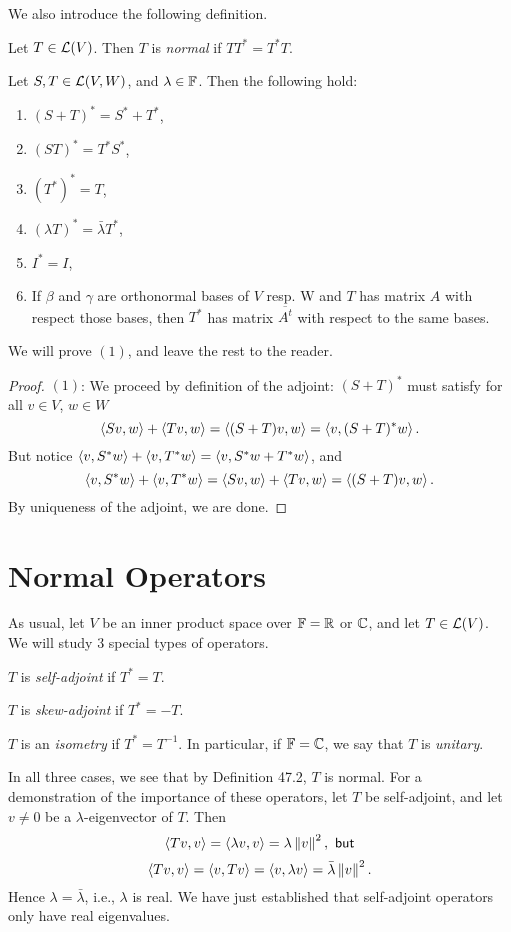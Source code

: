 \documentclass{article}
\begin{document}
We also introduce the following definition.
\begin{definition}
Let $T\in\mathcal L(V)$. Then $T$ is \textit{normal} if $TT^* = T^*T$.
\end{definition}

\begin{proposition}
Let $S, T\in \mathcal L(V, W)$, and $\lambda\in\mathbb F$. Then the following hold:
\begin{enumerate}
    \item $(S+T)^* = S^* + T^*$,
    \item $(ST)^* = T^*S^*$,
    \item $(T^*)^* = T$,
    \item $(\lambda T)^* = \bar\lambda T^*$,
    \item $I^* = I$,
    \item If $\beta$ and $\gamma$ are orthonormal bases of $V$ resp. W and $T$ has matrix $A$ with respect those bases, then $T^*$ has matrix $\overline{A^t}$ with respect to the same bases.
\end{enumerate}
\end{proposition}
We will prove $(1)$, and leave the rest to the reader.
\begin{proof}
$(1)$: We proceed by definition of the adjoint: $(S+T)^*$ must satisfy for all $v\in V$, $w\in W$
$$\left\langle Sv, w\right\rangle + \left\langle Tv, w\right\rangle = \left\langle(S+T)v, w\right\rangle = \left\langle v, (S+T)^*w\right\rangle.$$
But notice $\left\langle v, S^*w\right\rangle + \left\langle v, T^*w\right\rangle = \left\langle v, S^*w + T^*w\right\rangle$, and
$$\left\langle v, S^*w\right\rangle + \left\langle v, T^*w\right\rangle = \left\langle Sv, w\right\rangle + \left\langle Tv, w\right\rangle = \left\langle(S+T)v, w\right\rangle.$$
By uniqueness of the adjoint, we are done.
\end{proof}

\section{Normal Operators}
As usual, let $V$ be an inner product space over $\mathbb F = \mathbb R$ or $\mathbb C$, and let $T\in \mathcal L(V)$. We will study 3 special types of operators.
\begin{definition}
$T$ is \textit{self-adjoint} if $T^* = T$.
\end{definition}
\begin{definition}
$T$ is \textit{skew-adjoint} if $T^* = -T$.
\end{definition}
\begin{definition}
$T$ is an \textit{isometry} if $T^* = T^{-1}$. In particular, if $\mathbb F = \mathbb C$, we say that $T$ is \textit{unitary}.
\end{definition}
In all three cases, we see that by Definition 47.2, $T$ is normal. For a demonstration of the importance of these operators, let $T$ be self-adjoint, and let $v\neq 0$ be a $\lambda$-eigenvector of $T$. Then
$$\left\langle Tv, v\right\rangle = \left\langle\lambda v,v\right\rangle = \lambda \left\Vert v\right\Vert^2, \textsf{ but}$$
$$\left\langle Tv, v\right\rangle = \left\langle v, Tv\right\rangle = \left\langle v, \lambda v\right\rangle = \bar\lambda \left\Vert v\right\Vert^2.$$
Hence $\lambda = \bar\lambda$, i.e., $\lambda$ is real. We have just established that self-adjoint operators only have real eigenvalues.
\end{document}

